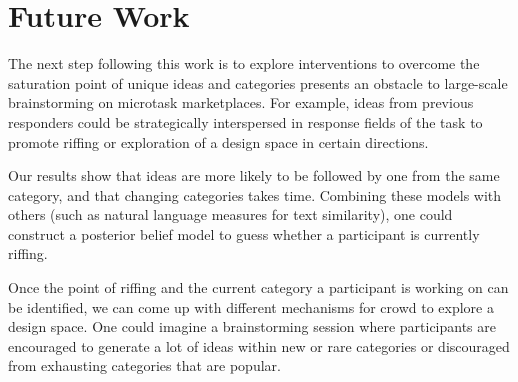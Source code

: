 \section{Future Work}




The next step following this work is to explore interventions to overcome the saturation point of unique ideas and categories presents an obstacle to large-scale brainstorming on microtask marketplaces. For example, ideas from previous responders could be strategically interspersed in response fields of the task to promote riffing or exploration of a design space in certain directions. 

Our results show that ideas are more likely to be followed by one from the same category, and that changing categories takes time. Combining these models with others (such as natural language measures for text similarity), one could construct a posterior belief model to guess whether a participant is currently riffing. 

Once the point of riffing and the current category a participant is working on can be identified, we can come up with different mechanisms for crowd to explore a design space. One could imagine a brainstorming session where participants are encouraged to generate a lot of ideas within new or rare categories or discouraged from exhausting categories that are popular.





